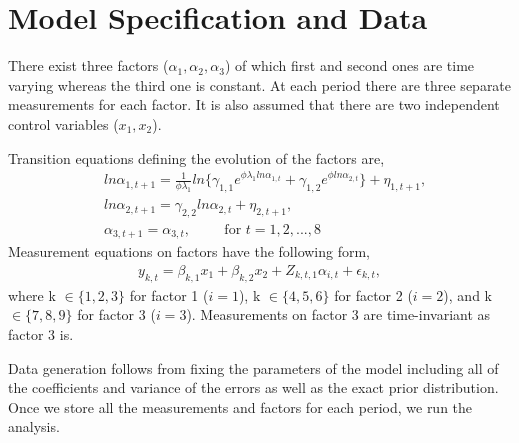 \documentclass[11pt, a4paper, leqno]{article}
\begin{document}
\section{Model Specification and Data} %
\label{sec:model spefication and data}

There exist three factors ($\alpha_1, \alpha_2, \alpha_3$) of which first and second ones are time varying whereas the third one is constant. At each period there are three separate measurements for each factor. It is also assumed that there are two independent control variables ($x_1, x_2$).  \par 
Transition equations defining the evolution of the factors are,
\begin{align}
& ln\alpha_{1, t+1}  = \displaystyle \frac{1}{\phi \lambda_1} ln \{ \gamma_{1, 1} e^{\phi \lambda_1 ln\alpha_{1, t}} + \gamma_{1, 2}  e^{\phi ln\alpha_{2, t}} \} + \eta_{1, t+1}, \\
& ln\alpha_{2, t+1} = \gamma_{2, 2} ln\alpha_{2, t} + \eta_{2, t+1}, \\
& \alpha_{3,t+1} = \alpha_{3,t}, \hspace{1cm} \text{for $t=1, 2, ..., 8$}
\end{align}
Measurement equations on factors have the following form,
\begin{align*}
y_{k, t} = \beta_{k, 1}x_1 + \beta_{k, 2}x_2 + Z_{k, t, 1}\alpha_{i, t} + \epsilon_{k, t} ,
\end{align*}
where k $\in \{1, 2, 3\}$ for factor 1 ($i=1$), k $\in \{4, 5, 6\}$ for factor 2 ($i=2$), and k $\in \{7, 8, 9\}$ for factor 3 ($i=3$). Measurements on factor 3 are time-invariant as factor 3 is.

Data generation follows from fixing the parameters of the model including all of the coefficients and variance of the errors as well as the exact prior distribution. Once we store all the measurements and factors for each period, we run the analysis.
\end{document}
